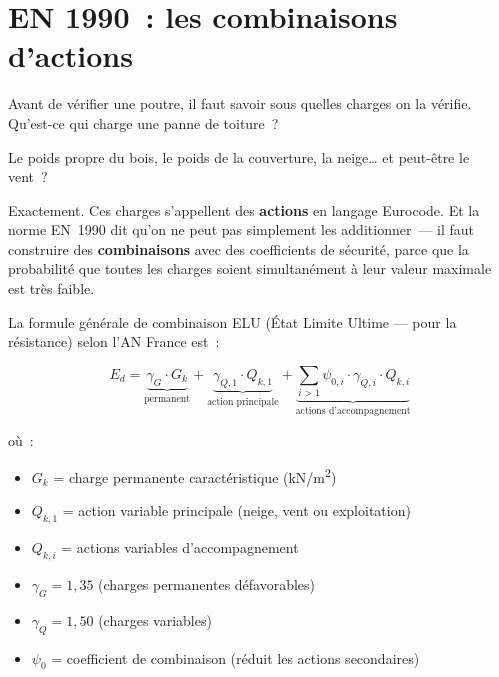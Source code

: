 \section{EN 1990~: les combinaisons d'actions}

\begin{maitre}
Avant de v\'erifier une poutre, il faut savoir sous quelles charges
on la v\'erifie. Qu'est-ce qui charge une panne de toiture~?
\end{maitre}

\begin{apprenti}
Le poids propre du bois, le poids de la couverture, la neige\ldots{}
et peut-\^etre le vent~?
\end{apprenti}

\begin{maitre}
Exactement. Ces charges s'appellent des \textbf{actions} en langage Eurocode.
Et la norme EN~1990 dit qu'on ne peut pas simplement les additionner~---
il faut construire des \textbf{combinaisons} avec des coefficients
de s\'ecurit\'e, parce que la probabilit\'e que toutes les charges
soient simultan\'ement \`a leur valeur maximale est tr\`es faible.
\end{maitre}

La formule g\'en\'erale de combinaison ELU (\'Etat Limite Ultime ---
pour la r\'esistance) selon l'AN France est~:

\begin{equation}
E_{d} = \underbrace{\gamma_G \cdot G_k}_{\text{permanent}}
      + \underbrace{\gamma_{Q,1} \cdot Q_{k,1}}_{\text{action principale}}
      + \underbrace{\sum_{i>1} \psi_{0,i} \cdot \gamma_{Q,i} \cdot Q_{k,i}}_{\text{actions d'accompagnement}}
\label{eq:elu}
\end{equation}

\noindent o\`u~:
\begin{itemize}
  \item $G_k$ = charge permanente caract\'eristique (kN/m\textsuperscript{2})
  \item $Q_{k,1}$ = action variable principale (neige, vent ou exploitation)
  \item $Q_{k,i}$ = actions variables d'accompagnement
  \item $\gamma_G = 1{,}35$ (charges permanentes d\'efavorables)
  \item $\gamma_Q = 1{,}50$ (charges variables)
  \item $\psi_0$ = coefficient de combinaison (r\'eduit les actions secondaires)
\end{itemize}

